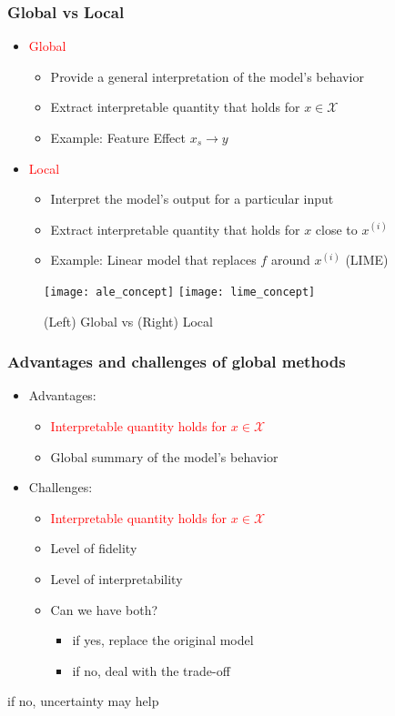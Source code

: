\begin{frame}
  \frametitle{Global vs Local}
  \begin{itemize}
    \item \textcolor{red}{Global}
    \begin{itemize}
      \item Provide a general interpretation of the model's behavior
      \item Extract interpretable quantity that holds for $x \in \mathcal{X}$
      \item Example: Feature Effect $x_s \rightarrow y$
    \end{itemize}
    \item \textcolor{red}{Local}
    \begin{itemize}
      \item Interpret the model's output for a particular input
      \item Extract interpretable quantity that holds for $x$ close to $x^{(i)}$
      \item Example: Linear model that replaces $f$ around $x^{(i)}$ (LIME)
    \end{itemize}
  \end{itemize}

  \begin{figure}
    \centering
    \texttt{[image: ale\_concept]}
    \texttt{[image: lime\_concept]}
    \caption{(Left) Global vs (Right) Local}
    \label{fig:figure-1}
  \end{figure}
\end{frame}


\begin{frame}
  \frametitle{Advantages and challenges of global methods}

  \begin{itemize}
    \item Advantages:
    \begin{itemize}
      \item \textcolor{red}{Interpretable quantity holds for $x \in \mathcal{X}$}
      \item Global summary of the model's behavior
    \end{itemize}
    \item Challenges:
  \begin{itemize}
    \item \textcolor{red}{Interpretable quantity holds for $x \in \mathcal{X}$}
    \item Level of fidelity
    \item Level of interpretability
    \item Can we have both?
    \begin{itemize}
      \item if yes, replace the original model
      \item if no, deal with the trade-off
    \end{itemize}
  \end{itemize}
  \end{itemize}

  \noindent\makebox[\linewidth]{\rule{\paperwidth}{0.4pt}}
  if no, uncertainty may help
\end{frame}


